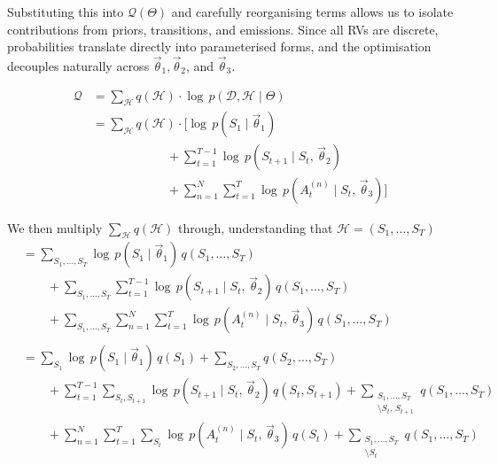 Substituting this into $\mathcal{Q}(\Theta)$ and carefully reorganising terms allows us to isolate contributions from priors, transitions, and emissions. Since all RVs are discrete, probabilities translate directly into parameterised forms, and the optimisation decouples naturally across $\vec{\theta}_1, \vec{\theta}_2$, and $\vec{\theta}_3$.

\begin{align*}
    \mathcal{Q} &= \sum\limits_{\mathcal{H}} q(\mathcal{H}) \cdot \log \, p(\mathcal{D}, \mathcal{H} \mid \Theta) \\
    &= \sum\limits_{\mathcal{H}} q(\mathcal{H}) \cdot \bigr[ \log \, p(S_1 \mid \vec{\theta}_1) \\ 
    &\qquad \qquad \qquad + \sum\limits_{t=1}^{T-1} \log \, p(S_{t+1} \mid S_t, \, \vec{\theta}_2) \\ 
    &\qquad \qquad \qquad + \sum\limits_{n=1}^N \sum\limits_{t=1}^T \log \, p(A_t^{(n)} \mid S_t, \, \vec{\theta}_3) \bigr]
\end{align*}

We then multiply $\sum\limits_{\mathcal{H}} q(\mathcal{H})$ through, understanding that $\mathcal{H} = (S_1, \dots, S_T)$
\begin{align*}
    &= \sum\limits_{S_1, \dots, S_T} \log \, p(S_1 \mid \vec{\theta}_1) \, q(S_1, \dots, S_T) \\ 
    & \qquad + \sum\limits_{S_1, \dots, S_T} \sum\limits_{t=1}^{T-1} \log \, p(S_{t+1} \mid S_t, \, \vec{\theta}_2) \, q(S_1, \dots, S_T) \\ 
    &\qquad + \sum\limits_{S_1, \dots, S_T} \sum\limits_{n=1}^N \sum\limits_{t=1}^T \log \, p(A_t^{(n)} \mid S_t, \, \vec{\theta}_3) \, q(S_1, \dots, S_T) \\
    \\
    &= \sum\limits_{S_1} \log \, p(S_1 \mid \vec{\theta}_1) \, q(S_1) + \sum\limits_{S_2, \dots, S_T} q(S_2, \dots, S_T) \\ 
    & \qquad + \sum\limits_{t=1}^{T-1} \sum\limits_{S_t, S_{t+1}} \log \, p(S_{t+1} \mid S_t, \, \vec{\theta}_2) \, q(S_t, S_{t+1}) + \sum_{\substack{S_1,\dots, S_T \\ \setminus S_t, \, S_{t+1}}} q(S_1, \dots, S_T) \\ 
    &\qquad + \sum\limits_{n=1}^N \sum\limits_{t=1}^T \sum\limits_{S_t} \log \, p(A_t^{(n)} \mid S_t, \, \vec{\theta}_3) \, q(S_t) + \sum_{\substack{S_1,\dots, S_T \\ \setminus S_t}} q(S_1, \dots, S_T) \\
\end{align*}

